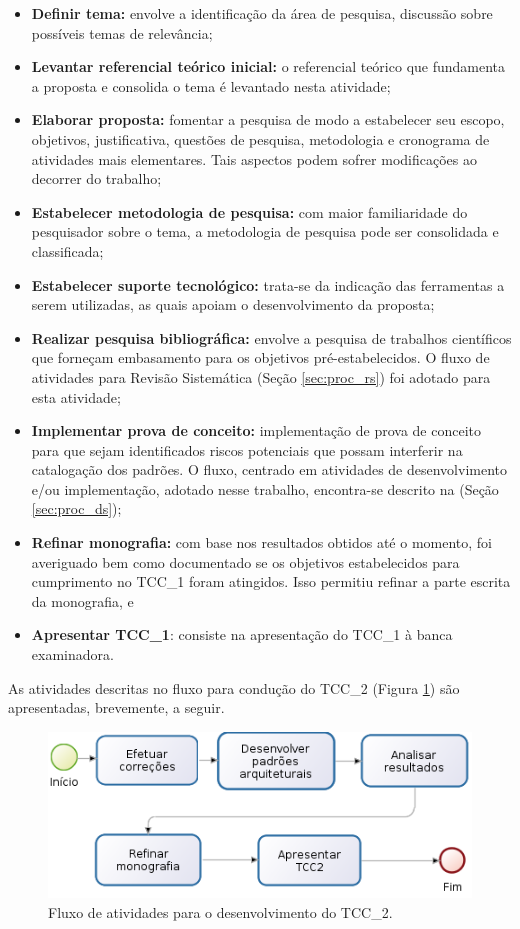 \begin{itemize}
    \item \textbf{Definir tema:} envolve a identificação da área de pesquisa, discussão sobre possíveis temas de relevância;
    \item \textbf{Levantar referencial teórico inicial:} o referencial teórico que fundamenta a proposta e consolida o tema é levantado nesta atividade;
    \item \textbf{Elaborar proposta:} fomentar a pesquisa de modo a estabelecer seu escopo, objetivos, justificativa, questões de pesquisa, metodologia e cronograma de atividades mais elementares. Tais aspectos podem sofrer modificações ao decorrer do trabalho;
    \item \textbf{Estabelecer metodologia de pesquisa:} com maior familiaridade do pesquisador sobre o tema, a metodologia de pesquisa pode ser consolidada e classificada;
    \item \textbf{Estabelecer suporte tecnológico:} trata-se da indicação das ferramentas a serem utilizadas, as quais apoiam o desenvolvimento da proposta;
    \item \textbf{Realizar pesquisa bibliográfica:} envolve a pesquisa de trabalhos científicos que forneçam embasamento para os objetivos pré-estabelecidos. O fluxo de atividades para Revisão Sistemática (Seção \ref{sec:proc_rs}) foi adotado para esta atividade;
    \item \textbf{Implementar prova de conceito:} implementação de prova de conceito para que sejam  identificados riscos potenciais que possam interferir na catalogação dos padrões. O fluxo, centrado em atividades de desenvolvimento e/ou implementação, adotado nesse trabalho, encontra-se descrito na (Seção \ref{sec:proc_ds});
    \item \textbf{Refinar monografia:} com base nos resultados obtidos até o momento, foi averiguado bem como documentado se os objetivos estabelecidos para cumprimento no TCC\_1 foram atingidos. Isso permitiu refinar a parte escrita da monografia, e
    \item \textbf{Apresentar TCC\_1}: consiste na apresentação do TCC\_1 à banca examinadora.
\end{itemize}


As atividades descritas no fluxo para condução do  TCC\_2 (Figura \ref{fig:proc_tcc2}) são apresentadas, brevemente, a seguir.

\begin{figure}[!htb]
\centering
\includegraphics[scale=0.6]{figuras/processo_tcc2}
\caption{Fluxo de atividades para o desenvolvimento do TCC\_2.}
\label{fig:proc_tcc2}
\end{figure}





